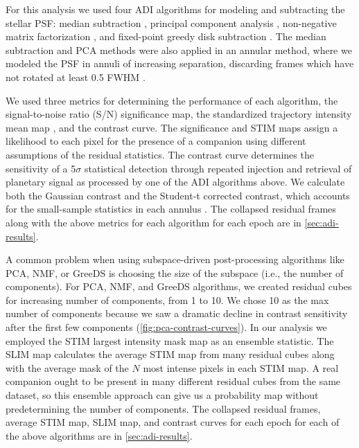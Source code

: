 \documentclass[twocolumn]{aastex631}
\begin{document}
For this analysis we used four ADI algorithms for modeling and subtracting the stellar PSF: median subtraction \citep{marois_angular_2006}, principal component analysis \citep[PCA, also referred to as KLIP;][]{soummer_detection_2012}, non-negative matrix factorization \citep[NMF;][]{ren_non-negative_2018}, and fixed-point greedy disk subtraction \citep[GreeDS;][]{pairet_reference-less_2019,pairet_mayonnaise_2020}. The median subtraction and PCA methods were also applied in an annular method, where we modeled the PSF in annuli of increasing separation, discarding frames which have not rotated at least 0.5 FWHM \citep{marois_angular_2006}.

We used three metrics for determining the performance of each algorithm, the signal-to-noise ratio (S/N) significance map, the standardized trajectory intensity mean map \citep[STIM map;][]{pairet_stim_2019}, and the contrast curve. The significance and STIM maps assign a likelihood to each pixel for the presence of a companion using different assumptions of the residual statistics. The contrast curve determines the sensitivity of a 5$\sigma$ statistical detection through repeated injection and retrieval of planetary signal as processed by one of the ADI algorithms above. We calculate both the Gaussian contrast and the Student-t corrected contrast, which accounts for the small-sample statistics in each annulus \citep{mawet_fundamental_2014}. The collapsed residual frames along with the above metrics for each algorithm for each epoch are in \autoref{sec:adi-results}.

A common problem when using subspace-driven post-processing algorithms like PCA, NMF, or GreeDS is choosing the size of the subspace (i.e., the number of components). For PCA, NMF, and GreeDS algorithms, we created residual cubes for increasing number of components, from 1 to 10. We chose 10 as the max number of components because we saw a dramatic decline in contrast sensitivity after the first few components (\autoref{fig:pca-contrast-curves}). In our analysis we employed the STIM largest intensity mask map \citep[SLIM map;][]{pairet_signal_2020} as an ensemble statistic. The SLIM map calculates the average STIM map from many residual cubes along with the average mask of the $N$ most intense pixels in each STIM map. A real companion ought to be present in many different residual cubes from the same dataset, so this ensemble approach can give us a probability map without predetermining the number of components. The collapsed residual frames, average STIM map, SLIM map, and contrast curves for each epoch for each of the above algorithms are in \autoref{sec:adi-results}.
\end{document}
